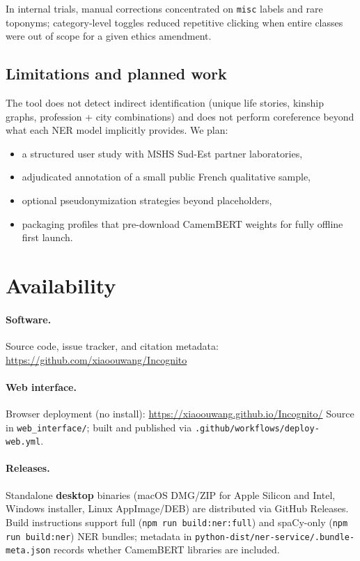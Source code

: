 \documentclass[11pt,a4paper]{article}
\begin{document}
In internal trials, manual corrections concentrated on \texttt{misc} labels and
rare toponyms; category-level toggles reduced repetitive clicking when entire
classes were out of scope for a given ethics amendment.

\subsection{Limitations and planned work}

The tool does not detect indirect identification (unique life stories, kinship
graphs, profession + city combinations) and does not perform coreference beyond
what each NER model implicitly provides.
We plan:
\begin{itemize}[noitemsep]
  \item a structured user study with MSHS Sud-Est partner laboratories,
  \item adjudicated annotation of a small public French qualitative sample,
  \item optional pseudonymization strategies beyond placeholders,
  \item packaging profiles that pre-download CamemBERT weights for fully offline
        first launch.
\end{itemize}

\section{Availability}
\label{sec:availability}

\paragraph{Software.}
Source code, issue tracker, and citation metadata:
\url{https://github.com/xiaoouwang/Incognito}

\paragraph{Web interface.}
Browser deployment (no install):
\url{https://xiaoouwang.github.io/Incognito/}
Source in \texttt{web\_interface/}; built and published via
\texttt{.github/workflows/deploy-web.yml}.

\paragraph{Releases.}
Standalone \textbf{desktop} binaries (macOS DMG/ZIP for Apple Silicon and Intel, Windows installer,
Linux AppImage/DEB) are distributed via GitHub Releases.
Build instructions support full (\texttt{npm run build:ner:full}) and spaCy-only
(\texttt{npm run build:ner}) NER bundles; metadata in
\texttt{python-dist/ner-service/.bundle-meta.json} records whether CamemBERT
libraries are included.
\end{document}
